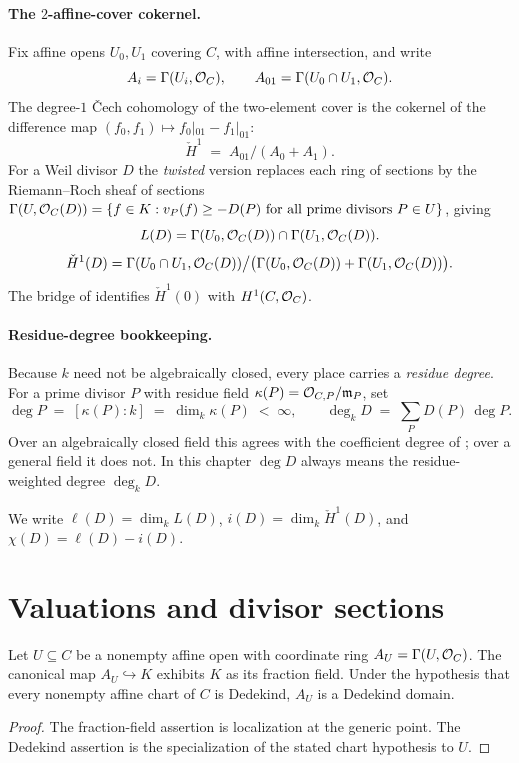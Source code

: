 \paragraph{The \(2\)-affine-cover cokernel.}
Fix affine opens \(U_0,U_1\) covering \(C\), with affine intersection, and
write
\[
  A_i = \Gamma(U_i, \mathcal{O}_{C}), \qquad
  A_{01} = \Gamma(U_0 \cap U_1, \mathcal{O}_{C}).
\]
The degree-\(1\) Čech cohomology of the two-element cover is the cokernel
of the difference map \((f_0, f_1) \mapsto f_0|_{01} - f_1|_{01}\):
\[
  \check{H}^1 \;=\; A_{01} \big/ (A_0 + A_1).
\]
For a Weil divisor \(D\) the \emph{twisted} version replaces each ring of
sections by the Riemann--Roch sheaf of sections
\(\Gamma(U, \mathcal{O}_{C}(D)) = \{ f \in K : v_P(f) \ge -D(P) \text{ for all
prime divisors } P \in U\}\), giving
\[
  L(D) = \Gamma(U_0, \mathcal{O}_{C}(D)) \cap \Gamma(U_1, \mathcal{O}_{C}(D)).
\]
\[
  \check{H}^1(D) = \Gamma(U_0 \cap U_1, \mathcal{O}_{C}(D)) \big/
    \bigl(\Gamma(U_0, \mathcal{O}_{C}(D)) + \Gamma(U_1, \mathcal{O}_{C}(D))\bigr).
\]
The bridge of  identifies
\(\check H^1(0)\) with \(H^1(C,\mathcal{O}_{C})\).

\paragraph{Residue-degree bookkeeping.}
Because \(k\) need not be algebraically closed, every place carries a
\emph{residue degree}. For a prime divisor \(P\) with residue field
\(\kappa(P) = \mathcal{O}_{C, P}/\mathfrak{m}_P\), set
\[
  \deg P \;=\; [\kappa(P) : k] \;=\; \dim_k \kappa(P) \;<\; \infty,
  \qquad
  \deg_k D \;=\; \sum_P D(P)\,\deg P .
\]
Over an algebraically closed field this agrees with the coefficient degree
of ; over a general field it does not.  In this
chapter \(\deg D\) always means the residue-weighted degree \(\deg_kD\).

We write \(\ell(D) = \dim_k L(D)\),
\(i(D) = \dim_k \check{H}^1(D)\), and
\(\chi(D) = \ell(D) - i(D)\).

\section{Valuations and divisor sections}
\label{sec:RiemannRoch_Adelic_substrate}

\begin{proposition}
  \label{thm:adelic_chartRing_isDedekindDomain}
  \leanok
  Let \(U \subseteq C\) be a nonempty affine open with coordinate ring
  \(A_U = \Gamma(U, \mathcal{O}_{C})\).  The canonical map
  \(A_U\hookrightarrow K\) exhibits \(K\) as its fraction field.  Under
  the hypothesis that every nonempty affine chart of \(C\) is Dedekind,
  \(A_U\) is a Dedekind domain.
\end{proposition}
\begin{proof}
  \leanok
  The fraction-field assertion is localization at the generic point.
  The Dedekind assertion is the specialization of the stated chart
  hypothesis to \(U\).
\end{proof}

